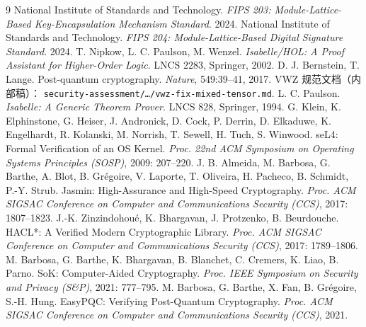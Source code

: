 \documentclass[UTF8,fontset=windows,zihao=-4,a4paper]{ctexart}
\newcommand{\code}[1]{\texttt{#1}}
\begin{document}
\begin{thebibliography}{9}
 National Institute of Standards and Technology.
  \emph{FIPS 203: Module-Lattice-Based Key-Encapsulation Mechanism Standard}. 2024.
 National Institute of Standards and Technology.
  \emph{FIPS 204: Module-Lattice-Based Digital Signature Standard}. 2024.
 T. Nipkow, L. C. Paulson, M. Wenzel.
  \emph{Isabelle/HOL: A Proof Assistant for Higher-Order Logic}.
  LNCS 2283, Springer, 2002.
 D. J. Bernstein, T. Lange.
  Post-quantum cryptography. \emph{Nature}, 549:39--41, 2017.
 VWZ 规范文档（内部稿）：
  \code{security-assessment/}\allowbreak\code{\ldots/}\allowbreak\code{vwz-fix-mixed-tensor.md}.
 L. C. Paulson.
  \emph{Isabelle: A Generic Theorem Prover}. LNCS 828, Springer, 1994.
 G. Klein, K. Elphinstone, G. Heiser, J. Andronick, D. Cock,
  P. Derrin, D. Elkaduwe, K. Engelhardt, R. Kolanski, M. Norrish, T. Sewell,
  H. Tuch, S. Winwood.
  seL4: Formal Verification of an OS Kernel.
  \emph{Proc. 22nd ACM Symposium on Operating Systems Principles (SOSP)}, 2009: 207--220.
 J. B. Almeida, M. Barbosa, G. Barthe, A. Blot, B. Gr\'egoire,
  V. Laporte, T. Oliveira, H. Pacheco, B. Schmidt, P.-Y. Strub.
  Jasmin: High-Assurance and High-Speed Cryptography.
  \emph{Proc. ACM SIGSAC Conference on Computer and Communications Security (CCS)}, 2017: 1807--1823.
 J.-K. Zinzindohou\'e, K. Bhargavan, J. Protzenko, B. Beurdouche.
  HACL*: A Verified Modern Cryptographic Library.
  \emph{Proc. ACM SIGSAC Conference on Computer and Communications Security (CCS)}, 2017: 1789--1806.
 M. Barbosa, G. Barthe, K. Bhargavan, B. Blanchet, C. Cremers,
  K. Liao, B. Parno.
  SoK: Computer-Aided Cryptography.
  \emph{Proc. IEEE Symposium on Security and Privacy (S\&P)}, 2021: 777--795.
 M. Barbosa, G. Barthe, X. Fan, B. Gr\'egoire, S.-H. Hung.
  EasyPQC: Verifying Post-Quantum Cryptography.
  \emph{Proc. ACM SIGSAC Conference on Computer and Communications Security (CCS)}, 2021.
\end{thebibliography}
\end{document}
